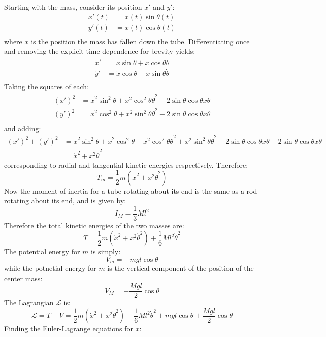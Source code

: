 \documentclass[9pt]{report}
\begin{document}
\begin{enumerate}
Starting with the mass, consider its position $x'$ and $y'$:
\[
\begin{align}
x'(t) &= x(t) \sin \theta(t) \\
y'(t) &= x(t) \cos \theta(t) \\
\end{align}
\]
where $x$ is the position the mass has fallen down the tube. Differentiating
once and removing the explicit time dependence for brevity yields:
\[
\begin{align}
\dot{x}' &= \dot{x} \sin \theta + x \cos \theta \dot{\theta}\\
\dot{y}' &= \dot{x} \cos \theta - x \sin \theta \dot{\theta } \\
\end{align}
\]
Taking the squares of each:
\[
\begin{align}
(\dot{x}')^2 &= \dot{x}^2 \sin^2 \theta + x^2 \cos^2 \theta \dot{\theta}^2 + 2\sin \theta \cos \theta \dot{x} \dot{\theta} \\
(\dot{y}')^2 &= \dot{x}^2 \cos^2 \theta + x^2 \sin^2 \theta \dot{\theta }^2 - 2\sin \theta \cos \theta \dot{x} \dot{\theta} \\
\end{align}
\]
and adding:
\[
\begin{align}
(\dot{x}')^2 + (\dot{y}')^2 &= \dot{x}^2 \sin^2 \theta + \dot{x}^2 \cos^2 \theta + x^2 \cos^2 \theta \dot{\theta}^2 + x^2 \sin^2 \theta \dot{\theta }^2 + 2\sin \theta \cos \theta \dot{x} \dot{\theta} - 2\sin \theta \cos \theta \dot{x} \dot{\theta} \\
&=  \dot{x}^2 + x^2\dot{\theta}^2
\end{align}
\]
corresponding to radial and tangential kinetic energies respectively.
Therefore:
\[
T_m = \frac{1}{2} m (\dot{x}^2 + x^2\dot{\theta}^2)
\]
Now the moment of inertia for a tube rotating about its end is the same as
a rod rotating about its end, and is given by:
\[
I_M = \frac{1}{3} M l^2
\]
Therefore the total kinetic energies of the two masses are:
\[
T = \frac{1}{2} m (\dot{x}^2 + x^2\dot{\theta}^2) + \frac{1}{6}  M l^2 \dot{\theta}^2
\]
The potential energy for $m$ is simply:
\[
V_m = -mgl\cos\theta
\]
while the potnetial energy for $m$ is the vertical component of the position of
the center mass:
\[
V_M = -\frac{Mgl}{2}\cos\theta
\]
The Lagrangian $\mathcal{L}$ is:
\[
\mathcal{L} = T - V = \frac{1}{2} m (\dot{x}^2 + x^2\dot{\theta}^2) + \frac{1}{6}  M l^2 \dot{\theta}^2 + mgl\cos\theta + \frac{Mgl}{2}\cos\theta
\]
Finding the Euler-Lagrange equations for $x$:
\[
\begin{align}

\end{align}\]
\end{enumerate}
\end{document}
